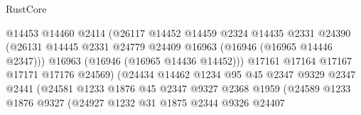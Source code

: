 \begin{lexlean}{RustCore}
\begin{coremodule}
                                        @14453
                                        @14460
                                        @2414
                                        (@26117
                                          @14452
                                          @14459
                                          @2324
                                          @14435
                                          @2331
                                          @24390
                                          (@26131
                                            @14445
                                            @2331
                                            @24779
                                            @24409
                                            @16963
                                            (@16946 (@16965 @14446 @2347)))
                                          @16963
                                          (@16946 (@16965 @14436 @14452)))
                                        @17161
                                        @17164
                                        @17167
                                        @17171
                                        @17176
                                        @24569)
                                      (@24434
                                        @14462
                                        @1234
                                        @95
                                        @45
                                        @2347
                                        @9329
                                        @2347
                                        @2441
                                        (@24581
                                          @1233
                                          @1876
                                          @45
                                          @2347
                                          @9327
                                          @2368
                                          @1959
                                          (@24589
                                            @1233
                                            @1876
                                            @9327
                                            (@24927
                                              @1232
                                              @31
                                              @1875
                                              @2344
                                              @9326
                                              @24407

\end{coremodule}
\end{lexlean}
